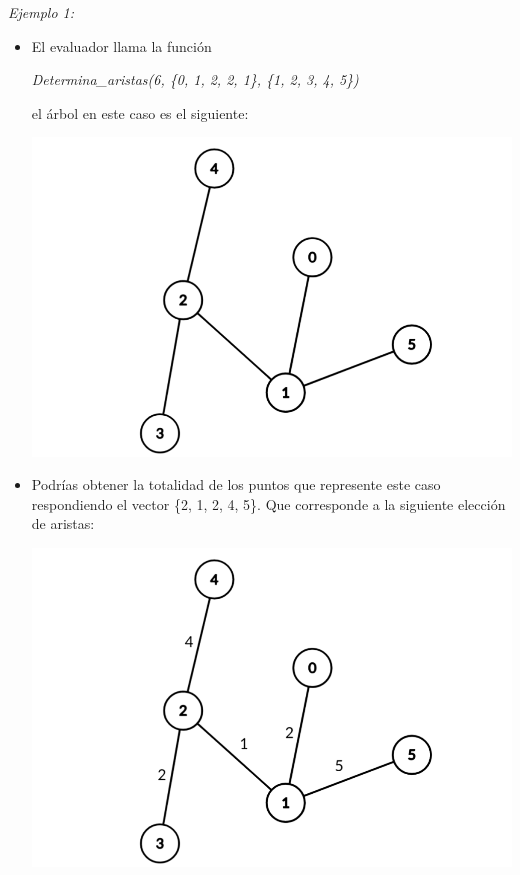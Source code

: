 \documentclass[12pt]{scrartcl}
\begin{document}
        {\itshape Ejemplo 1:}
        \begin{itemize}
            \item El evaluador llama la función 
            \begin{center}
                \textit{Determina\_aristas(6, \{0, 1, 2, 2, 1\}, \{1, 2, 3, 4, 5\})}
            \end{center}
            el árbol en este caso es el siguiente:
            \begin{center}
                \includegraphics[scale=0.25]{ej1.png}
            \end{center}
            \item Podrías obtener la totalidad de los puntos que represente este caso respondiendo el vector \{2, 1, 2, 4, 5\}. Que corresponde a la siguiente elección de aristas:
            \begin{center}
                \includegraphics[scale=0.25]{ej2.png}

\end{center}
\end{itemize}
\end{document}

